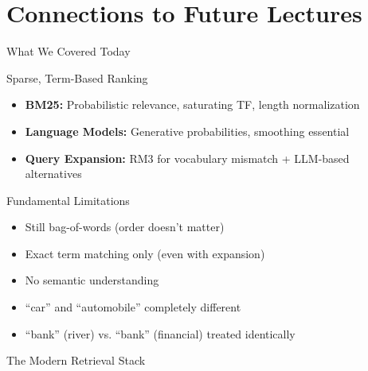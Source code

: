 \documentclass[aspectratio=169]{beamer}
\begin{document}
\section{Connections to Future Lectures}

\begin{frame}[plain]
\sectionpage
\end{frame}

\begin{frame}{What We Covered Today}
\begin{block}{Sparse, Term-Based Ranking}
\begin{itemize}
    \item \textbf{BM25:} Probabilistic relevance, saturating TF, length normalization
    \item \textbf{Language Models:} Generative probabilities, smoothing essential
    \item \textbf{Query Expansion:} RM3 for vocabulary mismatch + LLM-based alternatives
\end{itemize}
\end{block}

\vspace{1em}

\begin{alertblock}{Fundamental Limitations}
\begin{itemize}
    \item Still bag-of-words (order doesn't matter)
    \item Exact term matching only (even with expansion)
    \item No semantic understanding
    \item ``car'' and ``automobile'' completely different
    \item ``bank'' (river) vs. ``bank'' (financial) treated identically
\end{itemize}
\end{alertblock}
\end{frame}

\begin{frame}{The Modern Retrieval Stack}
\begin{center}

\end{center}
\end{frame}
\end{document}
